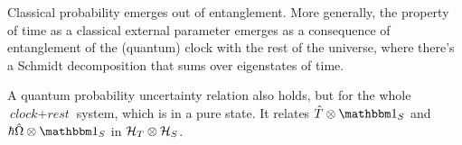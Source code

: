 Classical probability emerges out of entanglement. More generally,
the property of time as a classical external parameter emerges as
a consequence of entanglement of the (quantum) clock
with the rest of the universe, where there's a Schmidt decomposition
that sums over eigenstates of time.

A quantum probability uncertainty relation also holds, but for the whole
$\textit{clock} + \textit{rest}$ system, which is in a pure state.
It relates $\hat{T}\ox\idop_S$ and $\hbar\hat{\Omega}\ox\idop_S$
in $\mathcal{H}_T \otimes \mathcal{H}_S$.